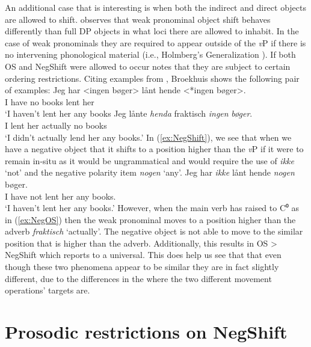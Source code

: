 \documentclass[12pt, letterpaper]{article}
\begin{document}
An additional case that is interesting is when both the indirect and direct objects are allowed to shift. \citet[417f]{broekhuisUnificationObjectShift2020} observes that weak pronominal object shift behaves differently than full DP objects in what loci there are allowed to inhabit. In the case of weak pronominals they are required to appear outside of the \textit{v}P if there is no intervening phonological material (i.e., Holmberg's Generalization \cite{holmbergWordOrderSyntactic1986,holmbergRemarksHolmbergGeneralization1999}). If both OS and NegShift were allowed to occur \citeauthor{broekhuisUnificationObjectShift2020} notes that they are subject to certain ordering restrictions. Citing examples from \citet[163ff]{christensenInterfacesNegationSyntax2005}, Broekhuis shows the following pair of examples:
	\ea 
		\ea \label{ex:NegShift}
		\gll Jeg har <ingen bøger> lånt hende <*ingen bøger>.\\
		I have no books lent her\\
		\glt `I haven't lent her any books
		\ex \label{ex:NegOS}
		\gll Jeg lånte \textit{henda} fraktisch \textit{ingen} \textit{bøger}.\\
		I lent her actually no books\\
		\glt `I didn't actually lend her any books.'
		\z 
	\z
In (\ref{ex:NegShift}), we see that when we have a negative object that it shifts to a position higher than the \textit{v}P if it were to remain in-situ as it would be ungrammatical and would require the use of \textit{ikke} `not' and the negative polarity item \textit{nogen} `any'.
	\ea
	\gll Jeg har \textit{ikke} lånt hende \textit{nogen} bøger.\\
	I have not lent her any books.\\
	\glt `I haven't lent her any books.'
	\z
However, when the main verb has raised to C⁰ as in (\ref{ex:NegOS}) then the weak pronominal moves to a position higher than the adverb \textit{fraktisch} `actually'. The negative object is not able to move to the similar position that is higher than the adverb. Additionally, this results in OS > NegShift which \citeauthor{broekhuisUnificationObjectShift2020} reports to a universal. This does help us see that that even though these two phenomena appear to be similar they are in fact slightly different, due to the differences in the where the two different movement operations' targets are.


\section{Prosodic restrictions on NegShift} \label{sec:NEGSHIFT}
\end{document}
